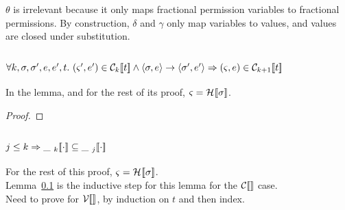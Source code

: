 $\theta$ is irrelevant because it only maps fractional permission variables to
fractional permissions. By construction, $\delta$ and $\gamma$ only map
variables to values, and values are closed under substitution.

\subsection{$
    \forall k, \sigma, \sigma', e, e', t.  \ (\varsigma', e') \in \mathcal{C}_{k} [\![ t ]\!] \wedge
    \langle \sigma, e \rangle \rightarrow \langle \sigma', e' \rangle
    \Rightarrow (\varsigma, e) \in \mathcal{C}_{k+1} [\![ t ]\!]
$}\label{stepInC}

In the lemma, and for the rest of its proof, $\varsigma = \mathcal{H}_{} [\![ \sigma ]\!]$.

\begin{proof}




\end{proof}

\subsection{$j \leq k \Rightarrow \mathcal{\_\ }_{k} [\![ \cdot ]\!] \subseteq \mathcal{\_\ }_{j} [\![ \cdot ]\!]$}\label{subsetKJ}

For the rest of this proof, $\varsigma = \mathcal{H}_{} [\![ \sigma ]\!]$.\\
Lemma~\ref{stepInC} is the inductive step for this lemma for the $\mathcal{C}_{} [\![  ]\!]$ case.\\
Need to prove for $\mathcal{V}_{} [\![  ]\!]$, by induction on $t$ and then index.

